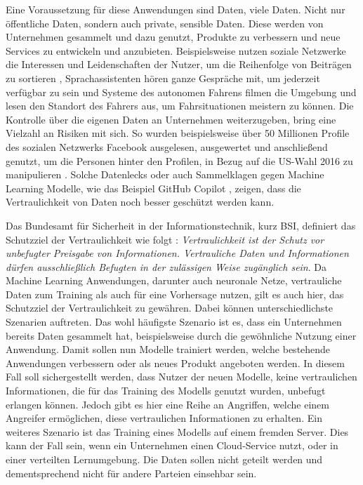 Eine Voraussetzung für diese Anwendungen sind Daten, viele Daten.
Nicht nur öffentliche Daten, sondern auch private, sensible Daten.
Diese werden von Unternehmen gesammelt und dazu genutzt, Produkte zu verbessern und neue Services zu entwickeln und anzubieten. 
Beispielsweise nutzen soziale Netzwerke die Interessen und Leidenschaften der Nutzer, um die Reihenfolge von Beiträgen zu sortieren \cite{twitter_algo}, Sprachassistenten hören ganze Gespräche mit, um jederzeit verfügbar zu sein und Systeme des autonomen Fahrens filmen die Umgebung und lesen den Standort des Fahrers aus, um Fahrsituationen meistern zu können.
Die Kontrolle über die eigenen Daten an Unternehmen weiterzugeben, bring eine Vielzahl an Risiken mit sich.
So wurden beispielsweise über 50 Millionen Profile des sozialen Netzwerks Facebook ausgelesen, ausgewertet und anschließend genutzt, um die Personen hinter den Profilen, in Bezug auf die US-Wahl 2016 zu manipulieren \cite{I-2}.
Solche Datenlecks oder auch Sammelklagen gegen Machine Learning Modelle, wie das Beispiel GitHub Copilot \cite{I-5}, zeigen, dass die Vertraulichkeit von Daten noch besser geschützt werden kann.

Das Bundesamt für Sicherheit in der Informationstechnik, kurz BSI, definiert das Schutzziel der Vertraulichkeit wie folgt \cite{bsi_it_grundschutz}: \textit{\dq Vertraulichkeit ist der Schutz vor unbefugter Preisgabe von Informationen. Vertrauliche Daten und Informationen dürfen ausschließlich Befugten in der zulässigen Weise zugänglich sein\dq}. 
Da Machine Learning Anwendungen, darunter auch neuronale Netze, vertrauliche Daten zum Training als auch für eine Vorhersage nutzen, gilt es auch hier, das Schutzziel der Vertraulichkeit zu gewähren.
Dabei können unterschiedlichste Szenarien auftreten.
Das wohl häufigste Szenario ist es, dass ein Unternehmen bereits Daten gesammelt hat, beispielsweise durch die gewöhnliche Nutzung einer Anwendung. 
Damit sollen nun Modelle trainiert werden, welche bestehende Anwendungen verbessern oder als neues Produkt angeboten werden. 
In diesem Fall soll sichergestellt werden, dass Nutzer der neuen Modelle, keine vertraulichen Informationen, die für das Training des Modells genutzt wurden, unbefugt erlangen können.
Jedoch gibt es hier eine Reihe an Angriffen, welche einem Angreifer ermöglichen, diese vertraulichen Informationen zu erhalten.
Ein weiteres Szenario ist das Training eines Modells auf einem fremden Server. 
Dies kann der Fall sein, wenn ein Unternehmen einen Cloud-Service nutzt, oder in einer verteilten Lernumgebung.
Die Daten sollen nicht geteilt werden und dementsprechend nicht für andere Parteien einsehbar sein.

